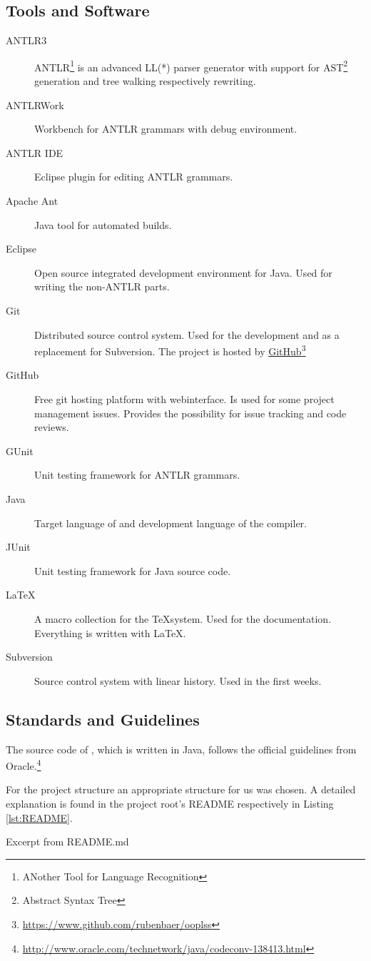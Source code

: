 \subsection{Tools and Software}
\begin{description}
	\item[ANTLR3] ANTLR\footnote{ANother Tool for Language
	Recognition} is an advanced LL(*) parser generator with support
	for AST\footnote{Abstract Syntax Tree} generation and tree
	walking respectively rewriting.
	\item[ANTLRWork] Workbench for ANTLR grammars with debug
	environment.
	\item[ANTLR IDE] Eclipse plugin for editing ANTLR grammars.
	\item[Apache Ant] Java tool for automated builds.
	\item[Eclipse] Open source integrated development environment
	for Java. Used for writing the non-ANTLR parts.
	\item[Git] Distributed source control system. Used for the
	development and as a replacement for Subversion. The project is
	hosted by \href{https://www.github.com/rubenbaer/ooplss}{GitHub}\footnote{\href{https://www.github.com/rubenbaer/ooplss}{https://www.github.com/rubenbaer/ooplss}}
	\item[GitHub] Free git hosting platform with webinterface. Is
	used for some project management issues. Provides the possibility
	for issue tracking and code reviews.
	\item[GUnit] Unit testing framework for ANTLR grammars.
	\item[Java] Target language of \ooplss and development language
	of the compiler.
	\item[JUnit] Unit testing framework for Java source code.
	\item[\LaTeX] A macro collection for the \TeX system. Used for
	the documentation. Everything is written with \LaTeX.
	\item[Subversion] Source control system with linear history. Used
	in the first weeks.
\end{description}

\subsection{Standards and Guidelines}
The source code of \ooplss, which is written in Java, follows the official
guidelines from Oracle.\footnote{\href{http://www.oracle.com/technetwork/java/codeconv-138413.html}{http://www.oracle.com/technetwork/java/codeconv-138413.html}}

For the project structure an appropriate structure for us was chosen.
A detailed explanation is found in the project root's README
respectively in Listing \ref{lst:README}.

\begin{listing}
	\caption{Excerpt from README.md}
	\label{lst:README}
\end{listing}

